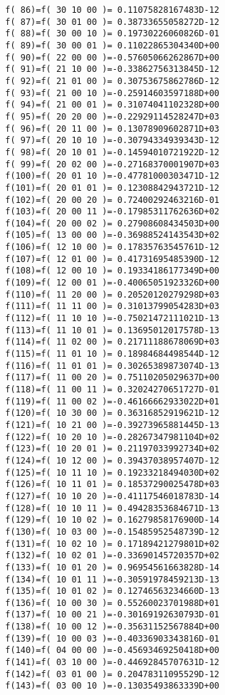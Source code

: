 {\begin{verbatim}
  f( 86)=f( 30 10 00 )= 0.11075828167483D-12
  f( 87)=f( 30 01 00 )= 0.38733655058272D-12
  f( 88)=f( 30 00 10 )= 0.19730226060826D-01
  f( 89)=f( 30 00 01 )= 0.11022865304340D+00
  f( 90)=f( 22 00 00 )=-0.57605066262867D+00
  f( 91)=f( 21 10 00 )=-0.33862756313845D-12
  f( 92)=f( 21 01 00 )= 0.30753675862786D-12
  f( 93)=f( 21 00 10 )=-0.25914603597188D+00
  f( 94)=f( 21 00 01 )= 0.31074041102328D+00
  f( 95)=f( 20 20 00 )=-0.22929114528247D+03
  f( 96)=f( 20 11 00 )= 0.13078909602871D+03
  f( 97)=f( 20 10 10 )=-0.30794334939343D-12
  f( 98)=f( 20 10 01 )=-0.14594010721922D-12
  f( 99)=f( 20 02 00 )=-0.27168370001907D+03
  f(100)=f( 20 01 10 )=-0.47781000303471D-12
  f(101)=f( 20 01 01 )= 0.12308842943721D-12
  f(102)=f( 20 00 20 )= 0.72400292463216D-01
  f(103)=f( 20 00 11 )=-0.17985311762636D+02
  f(104)=f( 20 00 02 )= 0.27908608434503D+00
  f(105)=f( 13 00 00 )=-0.36988524143543D+02
  f(106)=f( 12 10 00 )= 0.17835763545761D-12
  f(107)=f( 12 01 00 )= 0.41731695485390D-12
  f(108)=f( 12 00 10 )= 0.19334186177349D+00
  f(109)=f( 12 00 01 )=-0.40065051923326D+00
  f(110)=f( 11 20 00 )= 0.20520120279298D+03
  f(111)=f( 11 11 00 )= 0.31013799054283D+03
  f(112)=f( 11 10 10 )=-0.75021472111021D-13
  f(113)=f( 11 10 01 )= 0.13695012017578D-13
  f(114)=f( 11 02 00 )= 0.21711188678069D+03
  f(115)=f( 11 01 10 )= 0.18984684498544D-12
  f(116)=f( 11 01 01 )= 0.30265389873074D-13
  f(117)=f( 11 00 20 )= 0.75110205029637D+00
  f(118)=f( 11 00 11 )= 0.32024270651727D-01
  f(119)=f( 11 00 02 )=-0.46166662933022D+01
  f(120)=f( 10 30 00 )= 0.36316852919621D-12
  f(121)=f( 10 21 00 )=-0.39273965881445D-13
  f(122)=f( 10 20 10 )=-0.28267347981104D+02
  f(123)=f( 10 20 01 )= 0.21197033992734D+02
  f(124)=f( 10 12 00 )= 0.39437038957407D-12
  f(125)=f( 10 11 10 )= 0.19233218494030D+02
  f(126)=f( 10 11 01 )= 0.18537290025478D+03
  f(127)=f( 10 10 20 )=-0.41117546018783D-14
  f(128)=f( 10 10 11 )= 0.49428353684671D-13
  f(129)=f( 10 10 02 )= 0.16279858176900D-14
  f(130)=f( 10 03 00 )=-0.15485952548739D-12
  f(131)=f( 10 02 10 )= 0.17189421279801D+02
  f(132)=f( 10 02 01 )=-0.33690145720357D+02
  f(133)=f( 10 01 20 )= 0.96954561663828D-14
  f(134)=f( 10 01 11 )=-0.30591978459213D-13
  f(135)=f( 10 01 02 )= 0.12746563234660D-13
  f(136)=f( 10 00 30 )= 0.55260023701988D+01
  f(137)=f( 10 00 21 )=-0.30169192630793D-01
  f(138)=f( 10 00 12 )=-0.35631152567884D+00
  f(139)=f( 10 00 03 )=-0.40336903343816D-01
  f(140)=f( 04 00 00 )=-0.45693469250418D+00
  f(141)=f( 03 10 00 )=-0.44692845707631D-12
  f(142)=f( 03 01 00 )= 0.20478311095529D-12
  f(143)=f( 03 00 10 )=-0.13035493863339D+00

\end{verbatim}}
